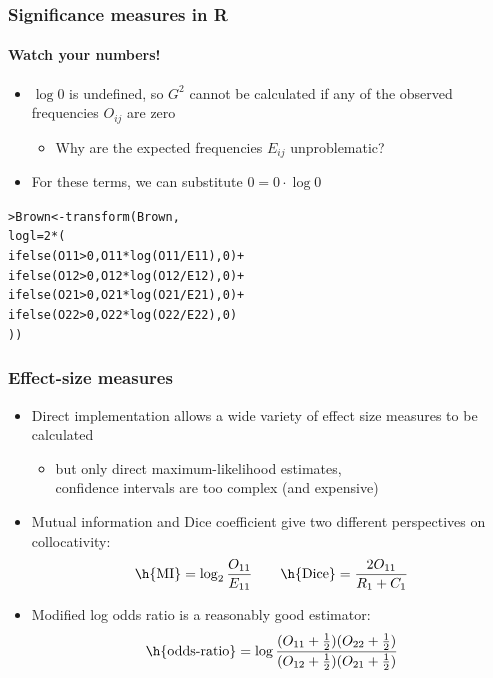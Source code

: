 \documentclass[t]{beamer} %
\begin{document}
\begin{frame}[fragile]
  \frametitle{Significance measures in R}
  \framesubtitle{Watch your numbers!}

  \begin{itemize}
  \item $\log 0$ is undefined, so $G^2$ cannot be calculated if any of the
    observed frequencies $O_{ij}$ are zero
    \begin{itemize}
    \item Why are the expected frequencies $E_{ij}$ unproblematic?
    \end{itemize}
    \pause
  \item For these terms, we can substitute $0 = 0\cdot \log 0$
  \end{itemize}

\begin{alltt}
> Brown <- transform(Brown,
  logl = 2 * (
    ifelse(O11>0, O11*log(O11/E11), 0) + 
    ifelse(O12>0, O12*log(O12/E12), 0) + 
    ifelse(O21>0, O21*log(O21/E21), 0) + 
    ifelse(O22>0, O22*log(O22/E22), 0)
  ))
\end{alltt}
\end{frame}


\begin{frame}
  \frametitle{Effect-size measures}

  \begin{itemize}
  \item Direct implementation allows a wide variety of effect size measures to
    be calculated
    \begin{itemize}
    \item but only direct maximum-likelihood estimates,\\
      confidence intervals are too complex (and expensive)
    \end{itemize}
  \item Mutual information and Dice coefficient give two different
    perspectives on collocativity:
    \[
    \text{\h{MI}} = \log_2 \frac{O_{11}}{E_{11}} \qquad
    \text{\h{Dice}} = \frac{2 O_{11}}{R_1 + C_1} 
    \]
  \item Modified log odds ratio is a reasonably good estimator:
    \[
    \text{\h{odds-ratio}} = 
    \log \frac{
      (O_{11} + \frac{1}{2}) (O_{22} + \frac{1}{2})
    }{
      (O_{12} + \frac{1}{2}) (O_{21} + \frac{1}{2})
    }
    \]
  \end{itemize}
\end{frame}
\end{document}
